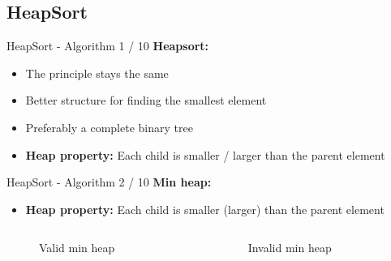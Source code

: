 \subsection{HeapSort}

\begin{frame}{HeapSort - Algorithm 1 / 10}
  \textbf{Heapsort:}
  \begin{itemize}
    \item
      The principle stays the same
    \item
      Better structure for finding the smallest element
  \end{itemize}
  \vspace{1em}
  \begin{itemize}
    \item<2- |handout:1>
      Preferably a complete binary tree
    \item<2- |handout:1>
      \textbf{Heap property:} Each child is smaller / larger than the parent
      element
  \end{itemize}
\end{frame}


\begin{frame}{HeapSort - Algorithm 2 / 10}
  \textbf{Min heap:}
  \begin{itemize}
    \item
      \textbf{Heap property:} Each child is {\color{MainA}smaller}
      (larger) than the parent element
  \end{itemize}
  \begin{columns}%
    \begin{column}[b]{0.45\textwidth}%
      \begin{figure}[!h]%
        \begin{adjustbox}{height=0.75\linewidth}%
          
        \end{adjustbox}
        \caption{Valid min heap}
        \label{fig:minheap_valid}
      \end{figure}
    \end{column}%
    \hspace*{0.1em}%
    \begin{column}[b]{0.45\textwidth}%
      \begin{figure}[!h]%
        \begin{adjustbox}{height=0.75\linewidth}%
          
        \end{adjustbox}
        \caption{Invalid min heap}
        \label{fig:minheap_invalid}
      \end{figure}
    \end{column}
  \end{columns}
\end{frame}

